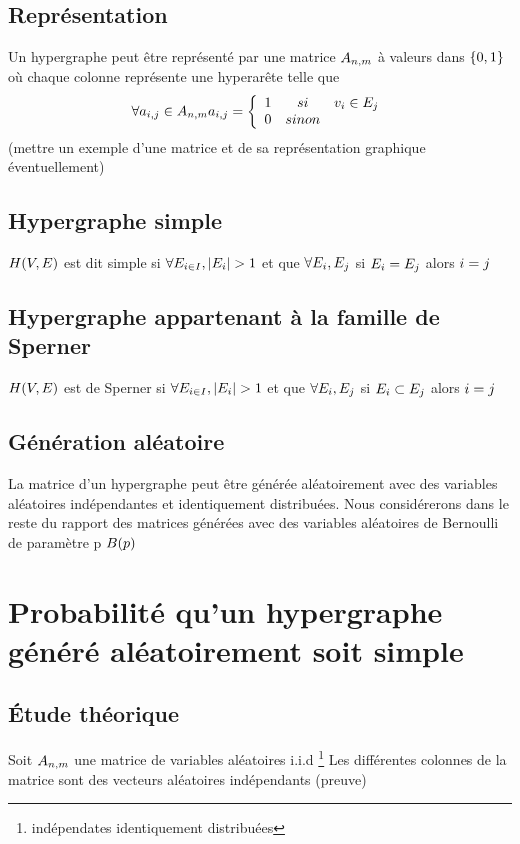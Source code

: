 \documentclass[a4paper,11pt]{article}
\begin{document}
\subsection{Représentation}
Un hypergraphe peut être représenté par une matrice $\mathlarger{A_{n,m}}$ à valeurs dans $\mathlarger{\{0,1\}}$ où chaque colonne représente une hyperarête telle que
\[\forall a_{i,j} \in A_{n,m} a_{i,j} = 
	\left \{
   \begin{array}{r c l}
      1  &si& v_{i} \in E_{j} \\
      0   &sinon \\
   \end{array}
   \right . \]
(mettre un exemple d'une matrice et de sa représentation graphique éventuellement)\\

\subsection{Hypergraphe simple}
$\mathlarger{H(V,E)}$ est dit simple si $\mathlarger{\forall E_{i \in I}, |E_{i}|>1}$ et que $\mathlarger{\forall E_{i}, E_{j}}$ si $\mathlarger{E_{i} = E_{j} }$ alors $\mathlarger{i = j}$
\subsection{Hypergraphe appartenant à la famille de Sperner}
$\mathlarger{H(V,E)}$ est de Sperner si $\mathlarger{\forall E_{i \in I}, |E_{i}|>1}$ et que $\mathlarger{\forall E_{i}, E_{j}}$ si $\mathlarger{E_{i} \subset E_{j} }$ alors $\mathlarger{i = j}$

\subsection{Génération aléatoire}
La matrice d'un hypergraphe peut être générée aléatoirement avec des variables aléatoires indépendantes et identiquement distribuées. Nous considérerons dans le reste du rapport des matrices générées avec des variables aléatoires de Bernoulli de paramètre p $\mathlarger{B(p)}$ 


\newpage

\section{Probabilité qu'un hypergraphe généré aléatoirement soit simple}
\subsection{Étude théorique}
Soit $\mathlarger{A_{n,m}}$ une matrice de variables aléatoires i.i.d \footnote{indépendates identiquement distribuées} 
Les différentes colonnes de la matrice sont des vecteurs aléatoires indépendants (preuve)\\
\end{document}
